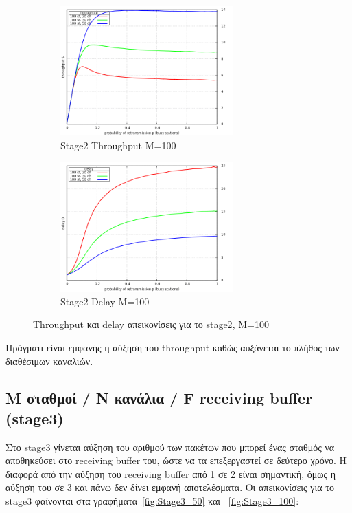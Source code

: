 \documentclass[12pt]{report}
\begin{document}
\begin{figure}[h]
\begin{subfigure}{0.5\textwidth}
\includegraphics[width=0.9\linewidth, height=5cm]{st2_throughput_M100} 
\caption{\textlatin{Stage2 Throughput M=100}}
\label{fig:st2_throughput_100}
\end{subfigure}
\begin{subfigure}{0.5\textwidth}
\includegraphics[width=0.9\linewidth, height=5cm]{st2_delay_M100}
\caption{\textlatin{Stage2 Delay M=100}}
\label{fig:st2_delay_100}
\end{subfigure}
 
\caption{\textlatin{Throughput} και \textlatin{delay} απεικονίσεις για το \textlatin{stage2}, M=100}
\label{fig:Stage2_100}
\end{figure}
Πράγματι είναι εμφανής η αύξηση του \textlatin{throughput} καθώς αυξάνεται το πλήθος των διαθέσιμων καναλιών.

\subsection{\textlatin{M} σταθμοί / \textlatin{N} κανάλια / \textlatin{F} \textlatin{receiving buffer} (\textlatin{stage3})}
Στο \textlatin{stage3} γίνεται αύξηση του αριθμού των πακέτων που μπορεί ένας σταθμός να αποθηκεύσει στο \textlatin{receiving buffer} του, ώστε να τα επεξεργαστεί σε δεύτερο χρόνο. Η διαφορά από την αύξηση του \textlatin{receiving buffer} από 1 σε 2 είναι σημαντική, όμως η αύξηση του σε 3 και πάνω δεν δίνει εμφανή αποτελέσματα. Οι απεικονίσεις για το \textlatin{stage3} φαίνονται στα γραφήματα~\ref{fig:Stage3_50} και ~\ref{fig:Stage3_100}:
\end{document}
